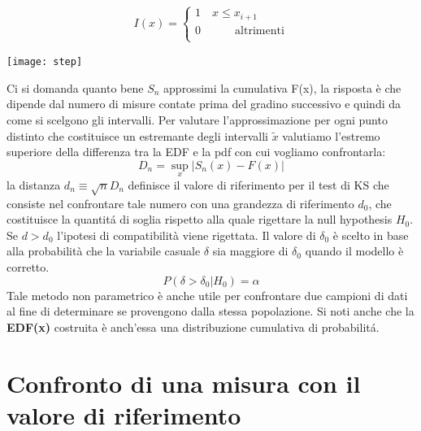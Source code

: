 \documentclass[11pt,a4paper]{book}
\begin{document}
\vspace{0.2in}

\begin{minipage}{.4\textwidth}
	\begin{align*}
I(x) = 
	\begin{cases}
	1 \quad x \leq x_{i+1} \\
	0 \quad \quad \quad \text{altrimenti}\\
	\end{cases}
\end{align*}
  \end{minipage}
  \begin{minipage}{.4\textwidth}
    \centering
    \texttt{[image: step]}	
  \end{minipage}
\vspace{0.2in}

Ci si domanda quanto bene $S_n$ approssimi la cumulativa F(x), la risposta \`{e} che dipende dal numero di misure contate prima del gradino successivo e quindi da come si scelgono gli intervalli. Per valutare l'approssimazione per ogni punto distinto che costituisce un estremante degli intervalli $\tilde{x}$ valutiamo l'estremo superiore della differenza tra la EDF e la pdf con cui vogliamo confrontarla:
\begin{equation*}
	D_n = \sup_{x} \vert S_n(x) -F(x) \vert 
\end{equation*}
 la distanza $d_n \equiv \sqrt{n}D_n$ definisce il valore di riferimento per il test di KS che consiste nel confrontare tale numero con una grandezza di riferimento $d_0$, che costituisce la quantit\'{a} di soglia rispetto alla quale rigettare la null hypothesis $H_0$. Se $d > d_0$ l'ipotesi di compatibilit\`{a} viene rigettata. Il valore di $\delta_0$ \`{e} scelto in base alla probabilit\`{a} che la variabile casuale $\delta$ sia maggiore di $\delta_0$ quando il modello \`{e} corretto.
 \begin{equation*}
 	P(\delta > \delta_0 \vert H_0) = \alpha
 \end{equation*}
Tale metodo non parametrico \`{e} anche utile per confrontare due campioni di dati al fine di determinare se provengono dalla stessa popolazione. Si noti anche che la \textbf{EDF(x)} costruita \`{e} anch'essa una distribuzione cumulativa di probabilit\'{a}.
 
 \section{Confronto di una misura con il valore di riferimento}
 
\end{document}
